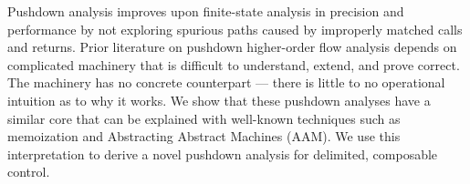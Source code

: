 Pushdown analysis improves upon finite-state analysis in precision and performance by not exploring spurious paths caused by improperly matched calls and returns.
%
Prior literature on pushdown higher-order flow analysis depends on complicated machinery that is difficult to understand, extend, and prove correct.
%
The machinery has no concrete counterpart --- there is little to no operational intuition as to why it works.
%
We show that these pushdown analyses have a similar core that can be explained with well-known techniques such as memoization and Abstracting Abstract Machines (AAM).
%
We use this interpretation to derive a novel pushdown analysis for delimited, composable control.